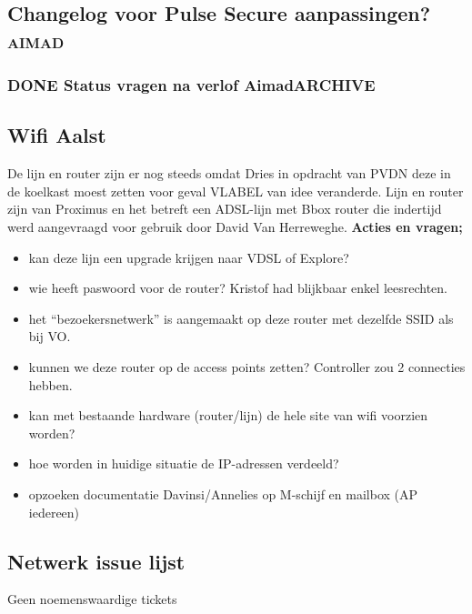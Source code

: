 \documentclass[11pt]{article}
\begin{document}
\subsection{Changelog voor Pulse Secure aanpassingen?\hfill{}\textsc{aimad}}
\label{sec:org5923fc2}
\subsubsection{{\bfseries\sffamily DONE} Status vragen na verlof Aimad\hfill{}\textsc{ARCHIVE}}
\label{sec:org7614b6a}
\subsection{Wifi Aalst}
\label{sec:orgb59469a}
De lijn en router zijn er nog steeds omdat Dries in opdracht van PVDN deze in de koelkast moest zetten voor geval VLABEL van idee veranderde. Lijn en router zijn van Proximus en het betreft een ADSL-lijn met Bbox router die indertijd werd aangevraagd voor gebruik door David Van Herreweghe.
\textbf{Acties en vragen;}
\begin{itemize}
\item kan deze lijn een upgrade krijgen naar VDSL of Explore?
\item wie heeft paswoord voor de router? Kristof had blijkbaar enkel leesrechten.
\item het ``bezoekersnetwerk'' is aangemaakt op deze router met dezelfde SSID als bij VO.
\item kunnen we deze router op de access points zetten? Controller zou 2 connecties hebben.
\item kan met bestaande hardware (router/lijn) de hele site van wifi voorzien worden?
\item hoe worden in huidige situatie de IP-adressen verdeeld?
\item opzoeken documentatie Davinsi/Annelies op M-schijf en mailbox (AP iedereen)
\end{itemize}
\subsection{Netwerk issue lijst}
\label{sec:org91bbd1d}
Geen noemenswaardige tickets
\end{document}
